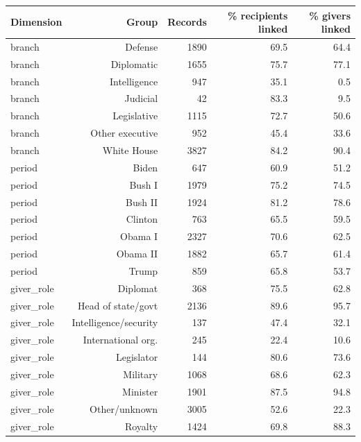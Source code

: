 \begin{tabular}{lrrrr}
\toprule
Dimension & Group & Records & \% recipients linked & \% givers linked \\
\midrule
branch & Defense & 1890 & 69.5 & 64.4 \\
branch & Diplomatic & 1655 & 75.7 & 77.1 \\
branch & Intelligence & 947 & 35.1 & 0.5 \\
branch & Judicial & 42 & 83.3 & 9.5 \\
branch & Legislative & 1115 & 72.7 & 50.6 \\
branch & Other executive & 952 & 45.4 & 33.6 \\
branch & White House & 3827 & 84.2 & 90.4 \\
period & Biden & 647 & 60.9 & 51.2 \\
period & Bush I & 1979 & 75.2 & 74.5 \\
period & Bush II & 1924 & 81.2 & 78.6 \\
period & Clinton & 763 & 65.5 & 59.5 \\
period & Obama I & 2327 & 70.6 & 62.5 \\
period & Obama II & 1882 & 65.7 & 61.4 \\
period & Trump & 859 & 65.8 & 53.7 \\
giver\_role & Diplomat & 368 & 75.5 & 62.8 \\
giver\_role & Head of state/govt & 2136 & 89.6 & 95.7 \\
giver\_role & Intelligence/security & 137 & 47.4 & 32.1 \\
giver\_role & International org. & 245 & 22.4 & 10.6 \\
giver\_role & Legislator & 144 & 80.6 & 73.6 \\
giver\_role & Military & 1068 & 68.6 & 62.3 \\
giver\_role & Minister & 1901 & 87.5 & 94.8 \\
giver\_role & Other/unknown & 3005 & 52.6 & 22.3 \\
giver\_role & Royalty & 1424 & 69.8 & 88.3 \\
\bottomrule
\end{tabular}
\par{}
